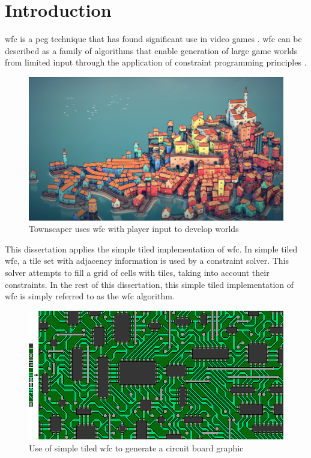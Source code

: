 \chapter{Introduction}
\acrfull{wfc} is a \acrfull{pcg} technique that has found significant use in video games \cite{Gumin_Wave_Function_Collapse_2016}. \acrshort{wfc} can be described as a family of algorithms that enable generation of large game worlds from limited input through the application of constraint programming principles \cite{WFC_ConstraintSolving_and_ML}.

\begin{figure}[H]
    \centering
    \includegraphics[width=\textwidth, height=0.3\textheight, keepaspectratio]{Images/Townscaper.png}
    \caption{Townscaper uses \acrshort{wfc} with player input to develop worlds \cite{townscaper}}
    \label{fig:townscaper}
\end{figure}

This dissertation applies the simple tiled implementation of \acrshort{wfc}. In simple tiled \acrshort{wfc}, a tile set with adjacency information is used by a constraint solver. This solver attempts to fill a grid of cells with tiles, taking into account their constraints. In the rest of this dissertation, this simple tiled implementation of \acrshort{wfc} is simply referred to as the \acrshort{wfc} algorithm.

\begin{figure}[H]
    \centering
    \includegraphics[width=\textwidth, height=0.3\textheight, keepaspectratio]{Images/circuit-1.png}
    \caption{Use of simple tiled \acrshort{wfc} to generate a circuit board graphic \cite{Gumin_Wave_Function_Collapse_2016}}
    \label{fig:WFCcircuit}
\end{figure}

